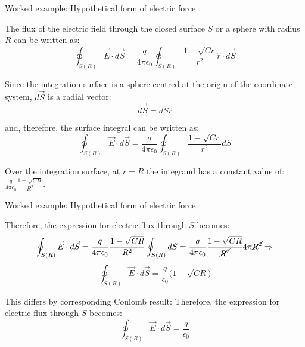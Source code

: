 {%
%
%

\begin{frame}{Worked example: Hypothetical form of electric force}

  The flux of the electric field through the
  closed surface $S$ or a sphere with radius $R$ can be written as:
  \begin{equation*}
    \oint_{S(R)} \vec{E} \cdot d\vec{S} =
       \frac{q}{4\pi \epsilon_0}
         \oint_{S(R)} \frac{1-\sqrt{Cr}}{r^2} \hat{r} \cdot d\vec{S}
  \end{equation*}

  Since the integration surface is a sphere centred at the origin
  of the coordinate system, $d\vec{S}$ is a radial vector:
  \begin{equation*}
    d\vec{S} = dS \hat{r}
  \end{equation*}

  and, therefore, the surface integral can be written as:
  \begin{equation*}
    \oint_{S(R)} \vec{E} \cdot d\vec{S} =
       \frac{q}{4\pi \epsilon_0}
         \oint_{S(R)} \frac{1-\sqrt{Cr}}{r^2} dS
  \end{equation*}

  Over the integration surface, at $r=R$ the integrand has a
  constant value of:
  $\displaystyle \frac{q}{4\pi \epsilon_0} \frac{1-\sqrt{CR}}{R^2}$.

\end{frame}

%
%
%

\begin{frame}{Worked example: Hypothetical form of electric force}

  Therefore, the expression for electric flux through $S$ becomes:
  \begin{equation*}
    \oint_{S(R)} \vec{E} \cdot d\vec{S} =
       \frac{q}{4\pi \epsilon_0}
         \frac{1-\sqrt{CR}}{R^2}
           \oint_{S(R)} dS =
        \frac{q}{4\pi \epsilon_0}
          \frac{1-\sqrt{CR}}{\cancel{R^2}} 4\pi\cancel{R^2} \Rightarrow
  \end{equation*}
  \begin{equation*}
    \oint_{S(R)} \vec{E} \cdot d\vec{S} =
        \frac{q}{\epsilon_0} \Big(1-\sqrt{CR}\Big)
  \end{equation*}

  This differs by corresponding Coulomb result:
  Therefore, the expression for electric flux through $S$ becomes:
  \begin{equation*}
    \oint_{S(R)} \vec{E} \cdot d\vec{S} = \frac{q}{\epsilon_0}
  \end{equation*}


\end{frame}}
